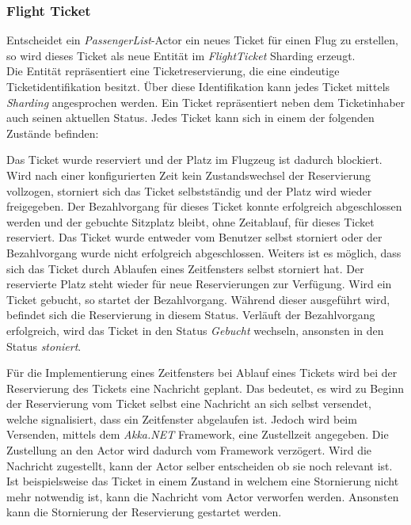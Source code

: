 \subsubsection{Flight Ticket}
Entscheidet ein \textit{PassengerList}-Actor ein neues Ticket für einen Flug zu erstellen, so wird dieses Ticket als neue Entität im \textit{FlightTicket} Sharding erzeugt. \\
Die Entität repräsentiert eine Ticketreservierung, die eine eindeutige Ticketidentifikation besitzt. Über diese Identifikation kann jedes Ticket mittels \textit{Sharding} angesprochen werden. Ein Ticket repräsentiert neben dem Ticketinhaber auch seinen aktuellen Status. Jedes Ticket kann sich in einem der folgenden Zustände befinden:
\begin{enumerate}
   Das Ticket wurde reserviert und der Platz im Flugzeug ist dadurch blockiert. Wird nach einer konfigurierten Zeit kein Zustandswechsel der Reservierung vollzogen, storniert sich das Ticket selbstständig und der Platz wird wieder freigegeben.
   Der Bezahlvorgang für dieses Ticket konnte erfolgreich abgeschlossen werden und der gebuchte Sitzplatz bleibt, ohne Zeitablauf, für dieses Ticket reserviert.
   Das Ticket wurde entweder vom Benutzer selbst storniert oder der Bezahlvorgang wurde nicht erfolgreich abgeschlossen. Weiters ist es möglich, dass sich das Ticket durch Ablaufen eines Zeitfensters selbst storniert hat. Der reservierte Platz steht wieder für neue Reservierungen zur Verfügung.
   Wird ein Ticket gebucht, so startet der Bezahlvorgang. Während dieser ausgeführt wird, befindet sich die Reservierung in diesem Status. Verläuft der Bezahlvorgang erfolgreich, wird das Ticket in den Status \textit{Gebucht} wechseln, ansonsten in den Status \textit{stoniert}.
\end{enumerate}
Für die Implementierung eines Zeitfensters bei Ablauf eines Tickets wird bei der Reservierung des Tickets eine Nachricht geplant. 
Das bedeutet, es wird zu Beginn der Reservierung vom Ticket selbst eine Nachricht an sich selbst versendet, welche signalisiert, dass ein Zeitfenster abgelaufen ist. Jedoch wird beim Versenden, mittels dem \textit{Akka.NET} Framework, eine Zustellzeit angegeben. Die Zustellung an den Actor wird dadurch vom Framework verzögert. Wird die Nachricht zugestellt, kann der Actor selber entscheiden ob sie noch relevant ist. Ist beispielsweise das Ticket in einem Zustand in welchem eine Stornierung nicht mehr notwendig ist, kann die Nachricht vom Actor verworfen werden. Ansonsten kann die Stornierung der Reservierung gestartet werden. \\

